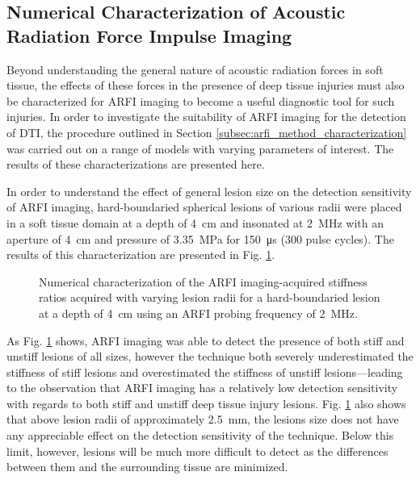 		\FloatBarrier
		\subsection{Numerical Characterization of Acoustic Radiation Force Impulse Imaging}
		\label{subsec:arfi_numerical_characterization}
			Beyond understanding the general nature of acoustic radiation forces in soft tissue, the effects of these forces in the presence of deep tissue injuries must also be characterized for ARFI imaging to become a useful diagnostic tool for such injuries. In order to investigate the suitability of ARFI imaging for the detection of DTI, the procedure outlined in Section \ref{subsec:arfi_method_characterization} was carried out on a range of models with varying parameters of interest. The results of these characterizations are presented here.

			In order to understand the effect of general lesion size on the detection sensitivity of ARFI imaging, hard-boundaried spherical lesions of various radii were placed in a soft tissue domain at a depth of \SI{4}{\cm} and insonated at \SI{2}{\MHz} with an aperture of \SI{4}{\cm} and pressure of \SI{3.35}{\MPa} for \SI{150}{\us} (300 pulse cycles). The results of this characterization are presented in Fig. \ref{fig:arfi_radius}.

			\begin{figure}[!htb]
				\centering
				\caption[Numerical characterization of ARFI imaging-acquired stiffness ratio with changing lesion radius]{Numerical characterization of the ARFI imaging-acquired stiffness ratios acquired with varying lesion radii for a hard-boundaried lesion at a depth of \SI{4}{\cm} using an ARFI probing frequency of \SI{2}{\MHz}.}
				\label{fig:arfi_radius}
			\end{figure}

			As Fig. \ref{fig:arfi_radius} shows, ARFI imaging was able to detect the presence of both stiff and unstiff lesions of all sizes, however the technique both severely underestimated the stiffness of stiff lesions and overestimated the stiffness of unstiff lesions---leading to the observation that ARFI imaging has a relatively low detection sensitivity with regards to both stiff and unstiff deep tissue injury lesions. Fig. \ref{fig:arfi_radius} also shows that above lesion radii of approximately \SI{2.5}{\mm}, the lesions size does not have any appreciable effect on the detection sensitivity of the technique. Below this limit, however, lesions will be much more difficult to detect as the differences between them and the surrounding tissue are minimized.

